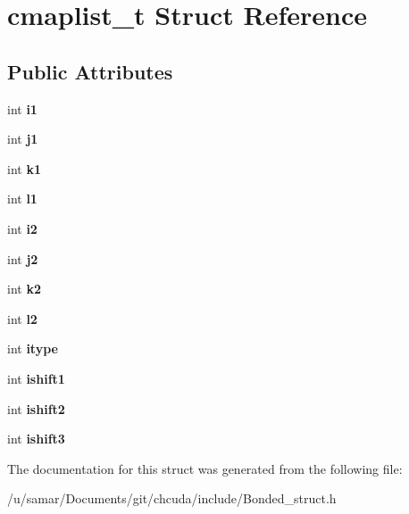 \hypertarget{structcmaplist__t}{}\section{cmaplist\+\_\+t Struct Reference}
\label{structcmaplist__t}
\subsection*{Public Attributes}
\begin{DoxyCompactItemize}
\item 
\hypertarget{structcmaplist__t_af20b86b4d2ee27a78e1d963f62c0eb24}{}\label{structcmaplist__t_af20b86b4d2ee27a78e1d963f62c0eb24} 
int {\bfseries i1}
\item 
\hypertarget{structcmaplist__t_a025be4b64b449138a182057628366f62}{}\label{structcmaplist__t_a025be4b64b449138a182057628366f62} 
int {\bfseries j1}
\item 
\hypertarget{structcmaplist__t_a27aa83e031be78b7a52f658e3983c1aa}{}\label{structcmaplist__t_a27aa83e031be78b7a52f658e3983c1aa} 
int {\bfseries k1}
\item 
\hypertarget{structcmaplist__t_aa246d30bfe09983e7c27eac80100c5e0}{}\label{structcmaplist__t_aa246d30bfe09983e7c27eac80100c5e0} 
int {\bfseries l1}
\item 
\hypertarget{structcmaplist__t_af38a9ff894d3082eed3f39fdecc7bb7d}{}\label{structcmaplist__t_af38a9ff894d3082eed3f39fdecc7bb7d} 
int {\bfseries i2}
\item 
\hypertarget{structcmaplist__t_a72ba55284cf24e322592d254659428cd}{}\label{structcmaplist__t_a72ba55284cf24e322592d254659428cd} 
int {\bfseries j2}
\item 
\hypertarget{structcmaplist__t_ad42d927d3bb03f2c840b90e5c5f3fe8d}{}\label{structcmaplist__t_ad42d927d3bb03f2c840b90e5c5f3fe8d} 
int {\bfseries k2}
\item 
\hypertarget{structcmaplist__t_abf056d3d39c4597a203594e0cc81f683}{}\label{structcmaplist__t_abf056d3d39c4597a203594e0cc81f683} 
int {\bfseries l2}
\item 
\hypertarget{structcmaplist__t_a2bc343247c3a83e82ae0fa18b438f942}{}\label{structcmaplist__t_a2bc343247c3a83e82ae0fa18b438f942} 
int {\bfseries itype}
\item 
\hypertarget{structcmaplist__t_acbeb5f2d7996fb2e0891b75d497dd01e}{}\label{structcmaplist__t_acbeb5f2d7996fb2e0891b75d497dd01e} 
int {\bfseries ishift1}
\item 
\hypertarget{structcmaplist__t_acc64db68337820d6c10e96db2873ea7f}{}\label{structcmaplist__t_acc64db68337820d6c10e96db2873ea7f} 
int {\bfseries ishift2}
\item 
\hypertarget{structcmaplist__t_aff160c33e722a49858b5fc6f9b4a9e15}{}\label{structcmaplist__t_aff160c33e722a49858b5fc6f9b4a9e15} 
int {\bfseries ishift3}
\end{DoxyCompactItemize}


The documentation for this struct was generated from the following file\+:\begin{DoxyCompactItemize}
\item 
/u/samar/\+Documents/git/chcuda/include/Bonded\+\_\+struct.\+h\end{DoxyCompactItemize}
